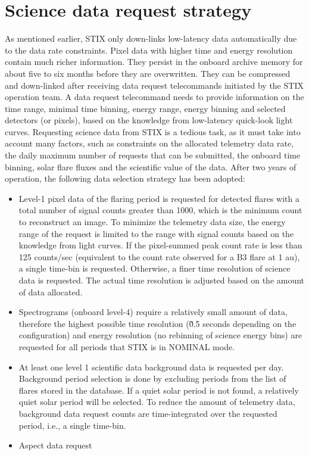 \documentclass[referee]{aa} %
\begin{document}
\section{Science data request strategy}
As mentioned earlier, STIX only down-links low-latency data 
automatically due to the data rate constraints.  
Pixel data with higher time and energy resolution contain much richer information. 
They persist in the onboard archive memory for about five to six months 
before they are overwritten.
They can be compressed and 
down-linked after receiving data request telecommands initiated by the STIX operation team. 
A data request telecommand needs to provide information on the
time range, minimal time binning, energy range, energy binning  and selected detectors (or pixels), based on 
the knowledge from low-latency quick-look light curves.
Requesting science data from STIX is a tedious task, as it must take
into account many factors, such as constraints on the  allocated telemetry data rate, 
the daily maximum number of requests that can be submitted,  
the onboard time binning, 
solar flare fluxes and the scientific value of the data. 
After two years of operation, the following data selection strategy has been adopted: 
\begin{itemize}
  \item 
  Level-1 pixel data 
  of the flaring period is requested for detected flares with a total number of signal counts  greater than 1000, 
  which is the minimum count to reconstruct an image.  
  To minimize the telemetry data size, 
  the energy range of the request is limited to the range with signal counts based on the 
  knowledge from light curves. 
  If the pixel-summed peak count rate is less than 125 counts/sec
  (equivalent to the count rate observed for a B3 flare at 1 au), 
  a single time-bin is requested. Otherwise, a finer time resolution of science data is requested.
  The actual time resolution is adjusted based on the amount of data allocated.
 \item Spectrograms (onboard level-4) require a relatively small amount of data, therefore
  the highest possible time resolution (\~ 0.5 seconds depending on the configuration)
   and energy resolution  (no rebinning of science energy bins) are requested for all periods that STIX is in NOMINAL mode. 
\item At least one level 1 scientific data background data is requested per day. 
Background period selection is done by excluding periods from the list of flares stored in the database. 
If a quiet solar period is not found, a relatively quiet solar period will be selected. 
To reduce the amount of telemetry data, 
background data request counts are time-integrated over the requested period, i.e., a single time-bin.

\item Aspect data request
\end{itemize}
\end{document}
